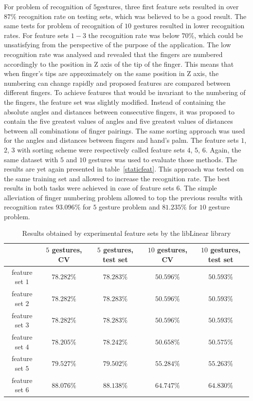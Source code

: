 For problem of recognition of $5$gestures, three first feature sets resulted in over $87\%$ recognition rate on testing sets, which was believed to be a good result.
The same tests for problem of recognition of $10$ gestures resulted in lower recognition rates.
For feature sets $1-3$ the recognition rate was below $70\%$, which could be unsatisfying from the perspective of the purpose of the application.
The low recognition rate was analysed and revealed that the fingers are numbered accordingly to the position in Z axis of the tip of the finger.
This means that when finger's tips are approximately on the same position in Z axis, the numbering can change rapidly and proposed features are compared between different fingers.
To achieve features that would be invariant to the numbering of the fingers, the feature set was slightly modified.
Instead of containing the absolute angles and distances between consecutive fingers, it was proposed to contain the five greatest values of angles and five greatest values of distances between all combinations of finger pairings.
The same sorting approach was used for the angles and distances between fingers and hand's palm.
The feature sets $1$, $2$, $3$ with sorting scheme were respectively called feature sets $4$, $5$, $6$.
Again, the same dataset with $5$ and $10$ gestures was used to evaluate those methods. 
The results are yet again presented in table~\ref{staticfeat}.
This approach was tested on the same training set and allowed to increase the recognition rate.
The best results in both tasks were achieved in case of feature sets $6$.
The simple alleviation of finger numbering problem allowed to top the previous results with recognition rates $93.096\%$ for $5$ gesture problem and $81.235\%$ for $10$ gesture problem. 

\begin{table}[htp!]
\begin{center}
	\label{staticfeatlin}
	\caption{Results obtained by experimental feature sets by the libLinear library}
    \begin{tabular}{|c|c|c|c|c|}
    \hline
    ~                                                   & $5$ gestures, CV & $5$ gestures, test set & $10$ gestures, CV  & $10$ gestures, test set \\ \hline
    feature set $1$                     & $78.282\%$ & $78.283\%$  & $50.596\%$ & $50.593\%$ \\ \hline
    feature set $2$                     & $78.282\%$ & $78.283\%$  & $50.596\%$ & $50.593\%$ \\ \hline
    feature set $3$                     & $78.282\%$ & $78.283\%$  & $50.596\%$ & $50.593\%$ \\ \hline
    feature set $4$                     & $78.205\%$ & $78.242\%$  & $50.658\%$ & $50.575\%$ \\ \hline
    feature set $5$                     & $79.527\%$ & $79.502\%$  & $55.284\%$ & $55.263\%$ \\ \hline
    feature set $6$                     & $88.076\%$ & $88.138\%$  & $64.747\%$ & $64.830\%$ \\ \hline
    \end{tabular}
    \end{center}
\end{table}

